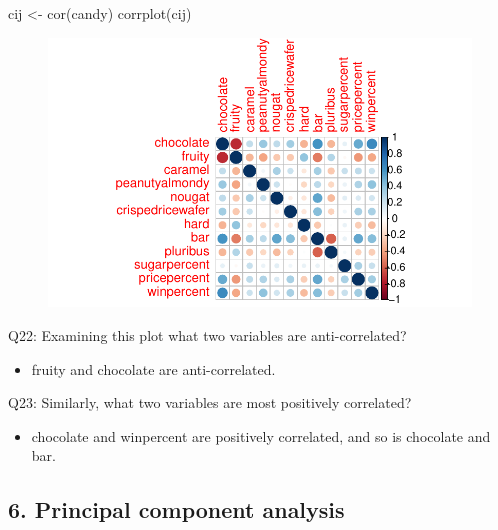 \documentclass[
  letterpaper,
  DIV=11,
  numbers=noendperiod]{scrartcl}
\newenvironment{Shaded}{\begin{snugshade}}{\end{snugshade}}
\newcommand{\FunctionTok}[1]{\textcolor[rgb]{0.28,0.35,0.67}{#1}}
\newcommand{\NormalTok}[1]{\textcolor[rgb]{0.00,0.23,0.31}{#1}}
\newcommand{\OtherTok}[1]{\textcolor[rgb]{0.00,0.23,0.31}{#1}}
\providecommand{\tightlist}{%
  \setlength{\itemsep}{0pt}\setlength{\parskip}{0pt}}\usepackage{longtable,booktabs,array}
\begin{document}
\begin{Shaded}
\begin{Highlighting}[]
\NormalTok{cij }\OtherTok{\textless{}{-}} \FunctionTok{cor}\NormalTok{(candy)}
\FunctionTok{corrplot}\NormalTok{(cij)}
\end{Highlighting}
\end{Shaded}

\begin{figure}[H]

{\centering \includegraphics{class10_project_files/figure-pdf/unnamed-chunk-18-1.pdf}

}

\end{figure}

Q22: Examining this plot what two variables are anti-correlated?

\begin{itemize}
\tightlist
\item
  fruity and chocolate are anti-correlated.
\end{itemize}

Q23: Similarly, what two variables are most positively correlated?

\begin{itemize}
\tightlist
\item
  chocolate and winpercent are positively correlated, and so is
  chocolate and bar.
\end{itemize}

\hypertarget{principal-component-analysis}{%
\subsection{6. Principal component
analysis}\label{principal-component-analysis}}
\end{document}
